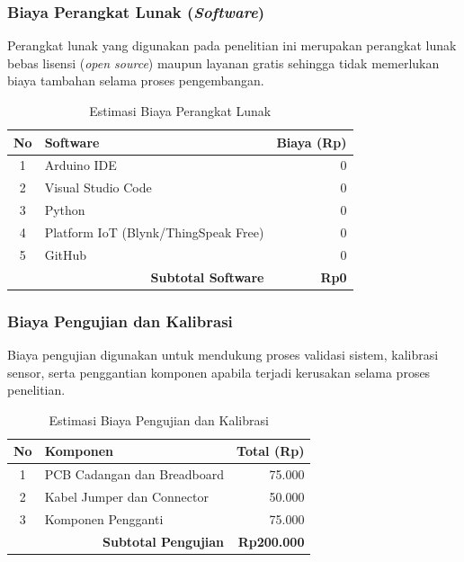 \documentclass{elsinta}
\begin{document}
\subsubsection{Biaya Perangkat Lunak (\textit{Software})}

Perangkat lunak yang digunakan pada penelitian ini merupakan perangkat lunak bebas lisensi (\textit{open source}) maupun layanan gratis sehingga tidak memerlukan biaya tambahan selama proses pengembangan.

\begin{table}[H]
\centering
\caption{Estimasi Biaya Perangkat Lunak}
\label{tab:biaya-software}
\renewcommand{\arraystretch}{1.3}

\begin{tabular}{|c|p{8cm}|r|}
\hline
\textbf{No} &
\centering\textbf{Software} &
\textbf{Biaya (Rp)}\\
\hline

1 & Arduino IDE & 0\\
\hline
2 & Visual Studio Code & 0\\
\hline
3 & Python & 0\\
\hline
4 & Platform IoT (Blynk/ThingSpeak Free) & 0\\
\hline
5 & GitHub & 0\\
\hline

\multicolumn{2}{|r|}{\textbf{Subtotal Software}} &
\textbf{Rp0}\\
\hline

\end{tabular}
\end{table}


\subsubsection{Biaya Pengujian dan Kalibrasi}

Biaya pengujian digunakan untuk mendukung proses validasi sistem, kalibrasi sensor, serta penggantian komponen apabila terjadi kerusakan selama proses penelitian.

\begin{table}[H]
\centering
\caption{Estimasi Biaya Pengujian dan Kalibrasi}
\label{tab:pengujian}
\renewcommand{\arraystretch}{1.3}

\begin{tabular}{|c|p{8cm}|r|}
\hline
\textbf{No} &
\centering\textbf{Komponen} &
\textbf{Total (Rp)}\\
\hline

1 & PCB Cadangan dan Breadboard & 75.000\\
\hline
2 & Kabel Jumper dan Connector & 50.000\\
\hline
3 & Komponen Pengganti & 75.000\\
\hline

\multicolumn{2}{|r|}{\textbf{Subtotal Pengujian}} &
\textbf{Rp200.000}\\
\hline

\end{tabular}
\end{table}
\end{document}

